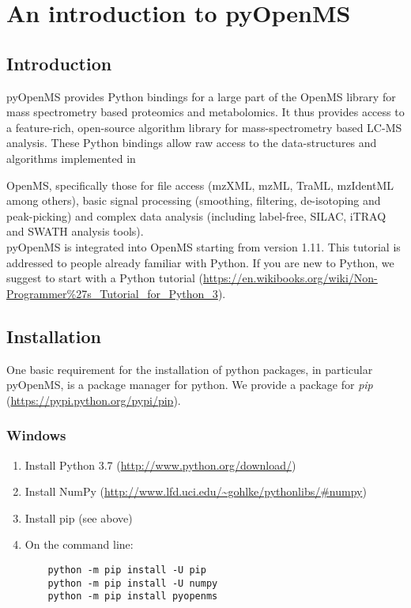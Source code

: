
\newpage
\section{An introduction to pyOpenMS}

\subsection{Introduction}
pyOpenMS provides Python bindings for a large part of the OpenMS library for mass spectrometry based proteomics and metabolomics. It thus provides access to a feature-rich, open-source algorithm library for mass-spectrometry based LC-MS analysis. These Python bindings allow raw access to the data-structures and algorithms implemented in {OpenMS, specifically those for file access (mzXML, mzML, TraML, mzIdentML among others), basic signal processing (smoothing, filtering, de-isotoping and peak-picking) and complex data analysis (including label-free, SILAC, iTRAQ and SWATH analysis tools).\\

\noindent pyOpenMS is integrated into OpenMS starting from version 1.11. This tutorial is addressed to people already familiar with Python. If you are new to Python, we suggest to start with a Python tutorial (\url{https://en.wikibooks.org/wiki/Non-Programmer%27s_Tutorial_for_Python_3}).

\subsection{Installation}
One basic requirement for the installation of python packages, in particular pyOpenMS, is a package manager for python. We provide a package for \textit{pip} (\url{https://pypi.python.org/pypi/pip}).

\subsubsection{Windows}
\begin{enumerate}
  \item Install Python 3.7 (\url{http://www.python.org/download/})
  \item Install NumPy (\url{http://www.lfd.uci.edu/~gohlke/pythonlibs/#numpy})
  \item Install pip (see above)
  \item On the command line:
    \begin{listing}
\begin{verbatim}
    python -m pip install -U pip
    python -m pip install -U numpy
    python -m pip install pyopenms
    \end{verbatim}
\end{listing}
\end{enumerate}

}
